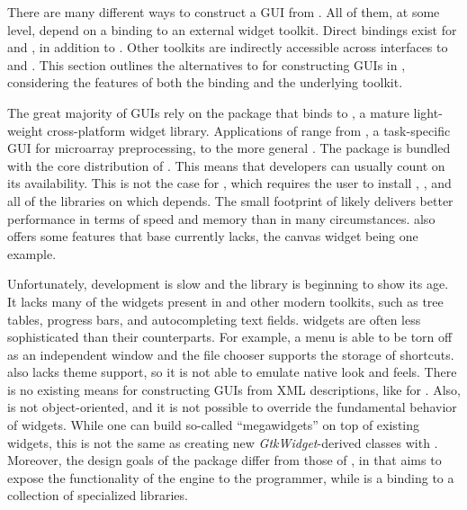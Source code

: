 \documentclass[article]{jss}
\begin{document}
There are many different ways to construct a GUI from .
All of them,
at some level, depend on a binding to an external widget toolkit.
Direct bindings
exist for  \citep{ousterhout,welch} and 
\citep{wxwidgets}, 
in addition to . Other toolkits are indirectly accessible
across 
interfaces to  \citep{DCOM} and 
\citep{Java}. 
This section outlines the alternatives to  for
constructing GUIs in , considering the features of both
the
 binding and the underlying toolkit.

The great majority of  GUIs rely on the 
package 
\citep{Rnews:Dalgaard:2001a, Rnews:Dalgaard:2002} that binds 
 to  \citep{ousterhout,welch}, a mature
light-weight cross-platform
widget library. Applications of  range from  
\citep{limma}, a task-specific GUI for microarray preprocessing, to
the more 
general  \citep{rcmndr}. The  package 
is bundled with the core distribution of 
. This means that developers can usually count on its
availability.
This is not the case for , which requires the user
to install , , and all of the libraries on which
depends. The small footprint of  likely delivers better
performance in
terms of speed and memory than  in many circumstances.
also offers some features that base  currently lacks, the
canvas widget
being one example.

Unfortunately,  development is slow and the library is
beginning
to show its age. It lacks many of the widgets present in 
and
other modern toolkits, such as tree tables, progress bars, and
autocompleting
text fields.  widgets are often less sophisticated than
their
 counterparts. For example, a  menu is able to be
torn off
as an independent window and the  file chooser supports the
storage
of shortcuts.  also lacks theme support, so it is not able
to
emulate native look and feels. There is no existing means
for constructing  GUIs from XML descriptions, like
\citep{libglade} for . Also,  is not
object-oriented,
and it is not possible to override the fundamental behavior of
widgets.
While one can build so-called ``megawidgets'' on top of existing
 widgets, this is not the same as creating new
\emph{GtkWidget}-derived
classes with . Moreover, the design goals of the
 package
differ from those of , in that  aims to expose
the 
functionality of the  engine to the 
programmer, while 
 is a binding to a collection of specialized 
libraries.
\end{document}
